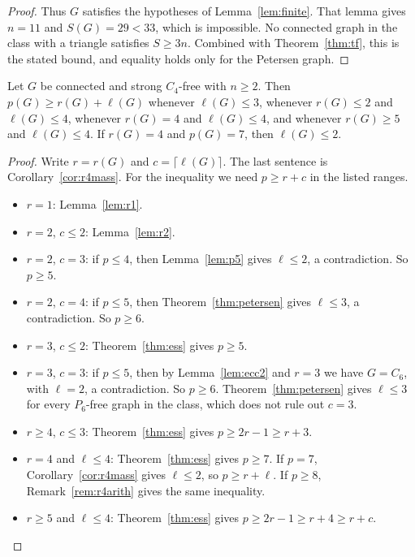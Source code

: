 \documentclass[ASNA]{USG}
\theoremstyle{WBstyletwo}
\numberwithin{equation}{section}
\newcommand{\lr}{\ell}
\newcommand{\pp}{p}
\begin{document}
\begin{proof}
Thus $G$ satisfies the hypotheses of Lemma~\ref{lem:finite}. That lemma gives $n=11$ and $S(G)=29<33$, which is impossible. No connected graph in the class with a triangle satisfies $S\ge 3n$. Combined with Theorem~\ref{thm:tf}, this is the stated bound, and equality holds only for the Petersen graph.
\end{proof}

\begin{theorem}[Theorem A]\label{thm:A}
Let $G$ be connected and strong $C_4$-free with $n\ge 2$. Then $\pp(G)\ge r(G)+\lr(G)$ whenever $\lr(G)\le 3$, whenever $r(G)\le 2$ and $\lr(G)\le 4$, whenever $r(G)=4$ and $\lr(G)\le 4$, and whenever $r(G)\ge 5$ and $\lr(G)\le 4$. If $r(G)=4$ and $\pp(G)=7$, then $\lr(G)\le 2$.
\end{theorem}

\begin{proof}
Write $r=r(G)$ and $c=\lceil\lr(G)\rceil$. The last sentence is Corollary~\ref{cor:r4mass}. For the inequality we need $\pp\ge r+c$ in the listed ranges.
\begin{itemize}
\item $r=1$: Lemma~\ref{lem:r1}.
\item $r=2$, $c\le 2$: Lemma~\ref{lem:r2}.
\item $r=2$, $c=3$: if $\pp\le 4$, then Lemma~\ref{lem:p5} gives $\lr\le 2$, a contradiction. So $\pp\ge 5$.
\item $r=2$, $c=4$: if $\pp\le 5$, then Theorem~\ref{thm:petersen} gives $\lr\le 3$, a contradiction. So $\pp\ge 6$.
\item $r=3$, $c\le 2$: Theorem~\ref{thm:ess} gives $\pp\ge 5$.
\item $r=3$, $c=3$: if $\pp\le 5$, then by Lemma~\ref{lem:ecc2} and $r=3$ we have $G=C_6$, with $\lr=2$, a contradiction. So $\pp\ge 6$. Theorem~\ref{thm:petersen} gives $\lr\le 3$ for every $P_6$-free graph in the class, which does not rule out $c=3$.
\item $r\ge 4$, $c\le 3$: Theorem~\ref{thm:ess} gives $\pp\ge 2r-1\ge r+3$.
\item $r=4$ and $\lr\le 4$: Theorem~\ref{thm:ess} gives $\pp\ge 7$. If $\pp=7$, Corollary~\ref{cor:r4mass} gives $\lr\le 2$, so $\pp\ge r+\lr$. If $\pp\ge 8$, Remark~\ref{rem:r4arith} gives the same inequality.
\item $r\ge 5$ and $\lr\le 4$: Theorem~\ref{thm:ess} gives $\pp\ge 2r-1\ge r+4\ge r+c$.
\end{itemize}
\end{proof}
\end{document}
